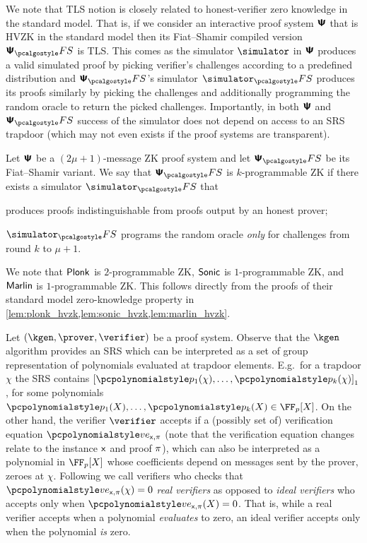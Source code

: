 \begin{remark}
  We note that TLS notion is closely related to honest-verifier zero knowledge in the standard model. That is, if we consider an interactive proof system $\bm{\mathsf{\Psi}}$ that is HVZK in the standard model then its Fiat--Shamir compiled version $\proofsystem_\fs$ is TLS. This comes as the simulator $\simulator$ in $\bm{\mathsf{\Psi}}$ produces a valid simulated proof by picking verifier's challenges according to a predefined distribution and $\proofsystem_\fs$'s simulator $\simulator_\fs$ produces its proofs similarly by picking the challenges and additionally programming the random oracle to return the picked challenges. Importantly, in both $\bm{\mathsf{\Psi}}$ and $\proofsystem_\fs$ success of the simulator does not depend on access to an SRS trapdoor (which may not even exists if the proof systems are transparent).
\end{remark}

\begin{definition}[$k$-programmable ZK]
  \label{def:kzk}
  Let $\bm{\mathsf{\Psi}}$ be a $(2\mu + 1)$-message ZK proof system and let $\ps_\fs$ be its
  Fiat--Shamir variant. We say that $\ps_\fs$ is $k$-programmable ZK if there
  exists a simulator $\simulator_\fs$ that
  \begin{compactenum}
  \item produces proofs indistinguishable from proofs output by an honest
    prover;
  \item $\simulator_\fs$ programs the random oracle \emph{only} for
    challenges from round $k$ to $\mu + 1$.
  \end{compactenum}
\end{definition}
We note that $\textnormal{\textsf{Plonk}}$ is $2$-programmable ZK, ${\textnormal{\textsf{Sonic}}}$ is $1$-programmable ZK,
and ${\textnormal{\textsf{Marlin}}}$ is $1$-programmable ZK. This follows directly from the proofs of
their standard model zero-knowledge property in
\cref{lem:plonk_hvzk,lem:sonic_hvzk,lem:marlin_hvzk}. 

 Let
$(\kgen, \prover, \verifier)$ be a proof system.
Observe that the $\kgen$ algorithm provides an SRS which can be interpreted as a
set of group representation of polynomials evaluated at trapdoor
elements. E.g.~for a trapdoor $\chi$ the SRS contains
$\gone{\p{p_1}(\chi), \ldots, \p{p_k}(\chi)}$, for some polynomials
$\p{p_1}(X), \ldots, \p{p_k}(X) \in \FF_p[X]$. On the other hand, the verifier
$\verifier$ accepts if a (possibly set of) verification equation
$\vereq_{\inp, \zkproof}$ (note that the verification equation changes relate to
the instance $\mathsf{x}$ and proof $\pi$), which can also be interpreted as a
polynomial in $\FF_p[X]$ whose coefficients depend on messages sent by the
prover, zeroes at $\chi$. Following \cite{EPRINT:GabWilCio19} we call verifiers
who checks that $\vereq_{\inp, \zkproof}(\chi) = 0$ \emph{real verifiers} as
opposed to \emph{ideal verifiers} who accepts only when
$\vereq_{\inp, \zkproof}(X) = 0$. That is, while a real verifier accepts when a
polynomial \emph{evaluates} to zero, an ideal verifier accepts only when the
polynomial \emph{is} zero.

